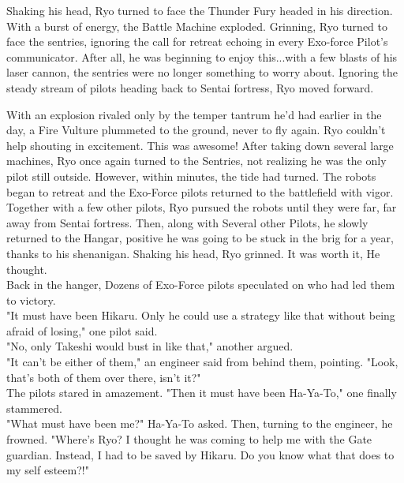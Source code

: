 \documentclass[11pt,twoside,a4paper]{book}
\begin{document}
\begin{multicols*}{2}
Shaking his head, Ryo turned to face the Thunder Fury headed in his direction. With a burst of energy, the Battle Machine exploded. Grinning, Ryo turned to face the sentries, ignoring the call for retreat echoing in every Exo-force Pilot's communicator. After all, he was beginning to enjoy this...with a few blasts of his laser cannon, the sentries were no longer something to worry about. Ignoring the steady stream of pilots heading back to Sentai fortress, Ryo moved forward. ~\\

\vfill
\columnbreak

With an explosion rivaled only by the temper tantrum he'd had earlier in the day, a Fire Vulture plummeted to the ground, never to fly again. Ryo couldn't help shouting in excitement. This was awesome! After taking down several large machines, Ryo once again turned to the Sentries, not realizing he was the only pilot still outside. However, within minutes, the tide had turned. The robots began to retreat and the Exo-Force pilots returned to the battlefield with vigor. ~\\

Together with a few other pilots, Ryo pursued the robots until they were far, far away from Sentai fortress. Then, along with Several other Pilots, he slowly returned to the Hangar, positive he was going to be stuck in the brig for a year, thanks to his shenanigan. Shaking his head, Ryo grinned. It was worth it, He thought. ~\\

Back in the hanger, Dozens of Exo-Force pilots speculated on who had led them to victory. ~\\

"It must have been Hikaru. Only he could use a strategy like that without being afraid of losing," one pilot said. ~\\

"No, only Takeshi would bust in like that," another argued. ~\\

"It can't be either of them," an engineer said from behind them, pointing. "Look, that's both of them over there, isn't it?" ~\\

The pilots stared in amazement. "Then it must have been Ha-Ya-To," one finally stammered. ~\\

"What must have been me?" Ha-Ya-To asked. Then, turning to the engineer, he frowned. "Where's Ryo? I thought he was coming to help me with the Gate guardian. Instead, I had to be saved by Hikaru. Do you know what that does to my self esteem?!" ~\\


\end{multicols*}
\end{document}
